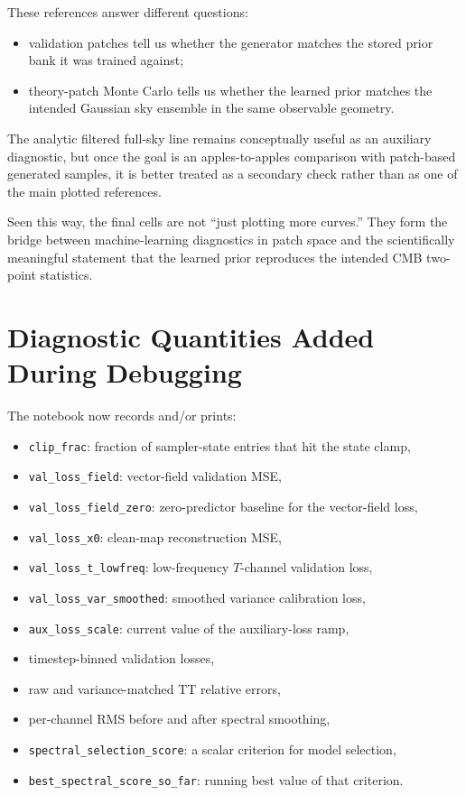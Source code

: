 \documentclass[11pt]{article}
\begin{document}
These references answer different questions:
\begin{itemize}[leftmargin=1.5em]
  \item validation patches tell us whether the generator matches the stored prior bank it was trained against;
  \item theory-patch Monte Carlo tells us whether the learned prior matches the intended Gaussian sky ensemble in the same observable geometry.
\end{itemize}
The analytic filtered full-sky line remains conceptually useful as an auxiliary diagnostic, but once the goal is an apples-to-apples comparison with patch-based generated samples, it is better treated as a secondary check rather than as one of the main plotted references.

Seen this way, the final cells are not ``just plotting more curves.'' They form the bridge between machine-learning diagnostics in patch space and the scientifically meaningful statement that the learned prior reproduces the intended CMB two-point statistics.

\section{Diagnostic Quantities Added During Debugging}

The notebook now records and/or prints:
\begin{itemize}[leftmargin=1.5em]
  \item \texttt{clip\_frac}: fraction of sampler-state entries that hit the state clamp,
  \item \texttt{val\_loss\_field}: vector-field validation MSE,
  \item \texttt{val\_loss\_field\_zero}: zero-predictor baseline for the vector-field loss,
  \item \texttt{val\_loss\_x0}: clean-map reconstruction MSE,
  \item \texttt{val\_loss\_t\_lowfreq}: low-frequency \(T\)-channel validation loss,
  \item \texttt{val\_loss\_var\_smoothed}: smoothed variance calibration loss,
  \item \texttt{aux\_loss\_scale}: current value of the auxiliary-loss ramp,
  \item timestep-binned validation losses,
  \item raw and variance-matched TT relative errors,
  \item per-channel RMS before and after spectral smoothing,
  \item \texttt{spectral\_selection\_score}: a scalar criterion for model selection,
  \item \texttt{best\_spectral\_score\_so\_far}: running best value of that criterion.
\end{itemize}
\end{document}
